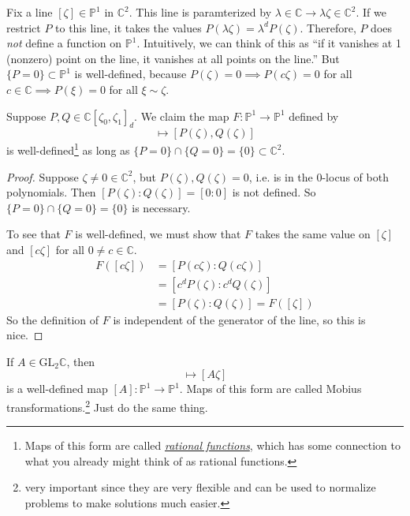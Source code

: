   Fix a line $[\zeta] \in \mathbb{P}^1$ in $\mathbb{C}^2$. This line is paramterized by $\lambda \in \mathbb{C} \to \lambda \zeta \in \mathbb{C}^2$. If we restrict $P$ to this line, it takes the values $P(\lambda \zeta) = \lambda^d P (\zeta)$. Therefore, $P$ does \textit{not} define a function on $\mathbb{P}^1$. Intuitively, we can think of this as ``if it vanishes at 1 (nonzero) point on the line, it vanishes at all points on the line.'' But $\{P = 0\} \subset \mathbb{P}^1$ is well-defined, because $P(\zeta) = 0 \implies P(c \zeta) = 0$ for all $c \in \mathbb{C} \implies P(\xi) = 0$ for all $\xi \sim \zeta$. 

  \begin{theorem}
    \label{thm:homogeneous-polynomials-induce-maps-of-p1}
    Suppose $P, Q \in \mathbb{C}[\zeta_0, \zeta_1]_d$. We claim the map $F: \mathbb{P}^1 \to \mathbb{P}^1$ defined by 
    \begin{equation}
      [\zeta] \mapsto [ P(\zeta), Q(\zeta)] 
    \end{equation}
    is well-defined\footnote{Maps of this form are called \textit{\hyperref[alg-def:rational-functions]{rational functions}}, which has some connection to what you already might think of as rational functions.} as long as $\{P = 0 \} \cap \{Q = 0\} = \{0\} \subset \mathbb{C}^2$. 
  \end{theorem}
  \begin{proof}
    Suppose $\zeta \neq 0 \in \mathbb{C}^2$, but $P(\zeta), Q(\zeta) = 0$, i.e. is in the $0$-locus of both polynomials. Then $[P(\zeta) : Q(\zeta)] = [0 : 0]$ is not defined. So $\{P = 0\} \cap \{Q = 0\} = \{0\}$ is necessary. 

    To see that $F$ is well-defined, we must show that $F$ takes the same value on $[\zeta]$ and $[c \zeta]$ for all $0 \neq c \in \mathbb{C}$. 
    \begin{align}
      F([c \zeta]) & = [P(c \zeta) : Q(c \zeta)] \\ 
                   & = [ c^d P(\zeta) : c^d Q(\zeta)] \\ 
                   & = [P(\zeta) : Q(\zeta)] = F([\zeta])
    \end{align}
    So the definition of $F$ is independent of the generator of the line, so this is nice. 
  \end{proof}

  \begin{example}
    \label{ex:gl2c-acts-on-p1}
    If $A \in \mathrm{GL}_2 \mathbb{C}$, then 
    \begin{equation}
      [\zeta] \mapsto [A \zeta] 
    \end{equation}
    is a well-defined map $[A] : \mathbb{P}^1 \to \mathbb{P}^1$. Maps of this form are called Mobius transformations.\footnote{very important since they are very flexible and can be used to normalize problems to make solutions much easier.} Just do the same thing. 
  \end{example}

